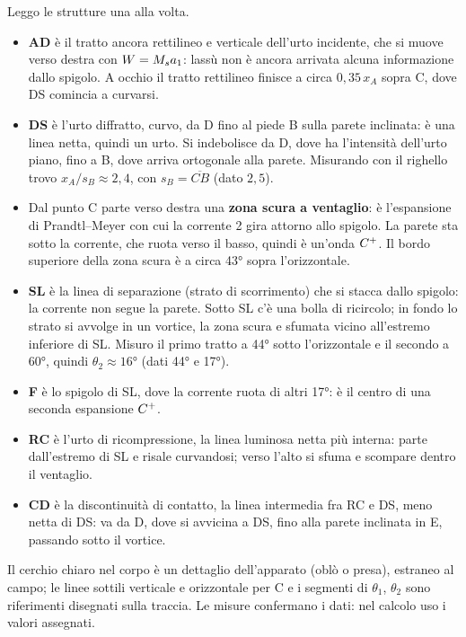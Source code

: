 Leggo le strutture una alla volta.
\begin{itemize}
\item \textbf{AD} è il tratto ancora rettilineo e verticale dell'urto incidente, che si muove verso destra con
  $W=M_{s} a_1$: lassù non è ancora arrivata alcuna informazione dallo spigolo. A occhio il tratto rettilineo finisce a
  circa $0{,}35\,x_A$ sopra C, dove DS comincia a curvarsi.
\item \textbf{DS} è l'urto diffratto, curvo, da D fino al piede B sulla parete inclinata: è una linea netta, quindi un
  urto. Si indebolisce da D, dove ha l'intensità dell'urto piano, fino a B, dove arriva ortogonale alla parete.
  Misurando con il righello trovo $x_A/s_B\approx2{,}4$, con $s_B=\overline{CB}$ (dato $2{,}5$).
\item Dal punto C parte verso destra una \textbf{zona scura a ventaglio}: è l'espansione di Prandtl--Meyer con cui la
  corrente 2 gira attorno allo spigolo. La parete sta sotto la corrente, che ruota verso il basso, quindi è un'onda
  $C^{+}$. Il bordo superiore della zona scura è a circa \ang{43} sopra l'orizzontale.
\item \textbf{SL} è la linea di separazione (strato di scorrimento) che si stacca dallo spigolo: la corrente non segue
  la parete. Sotto SL c'è una bolla di ricircolo; in fondo lo strato si avvolge in un vortice, la zona scura e sfumata
  vicino all'estremo inferiore di SL. Misuro il primo tratto a \ang{44} sotto l'orizzontale e il secondo a \ang{60},
  quindi $\theta_2\approx\ang{16}$ (dati \ang{44} e \ang{17}).
\item \textbf{F} è lo spigolo di SL, dove la corrente ruota di altri \ang{17}: è il centro di una seconda espansione
  $C^{+}$.
\item \textbf{RC} è l'urto di ricompressione, la linea luminosa netta più interna: parte dall'estremo di SL e risale
  curvandosi; verso l'alto si sfuma e scompare dentro il ventaglio.
\item \textbf{CD} è la discontinuità di contatto, la linea intermedia fra RC e DS, meno netta di DS: va da D, dove si
  avvicina a DS, fino alla parete inclinata in E, passando sotto il vortice.
\end{itemize}
Il cerchio chiaro nel corpo è un dettaglio dell'apparato (oblò o presa), estraneo al campo; le linee sottili verticale
e orizzontale per C e i segmenti di $\theta_1$, $\theta_2$ sono riferimenti disegnati sulla traccia. Le misure
confermano i dati: nel calcolo uso i valori assegnati.

